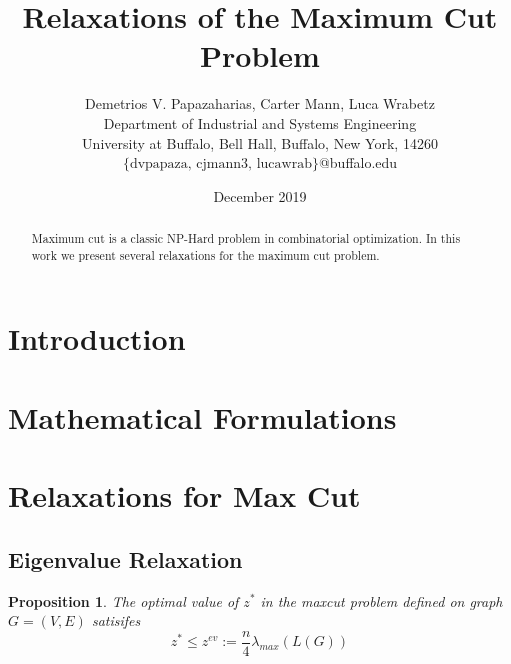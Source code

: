 \documentclass[12pt]{article}
\title{Relaxations of the Maximum Cut Problem}
\author{Demetrios V. Papazaharias, Carter Mann, Luca Wrabetz\\ \small Department of Industrial and Systems Engineering \\
\small University at Buffalo, Bell Hall, Buffalo, New York, 14260\\\small $\lbrace \text{dvpapaza, cjmann3, lucawrab}\rbrace$@buffalo.edu}
\date{December 2019}
\theoremstyle{plain}
\newtheorem{prop}{Proposition}
\theoremstyle{definition}
\begin{document}
\maketitle
\begin{abstract}
    Maximum cut is a classic NP-Hard problem in combinatorial optimization. In this work we present several relaxations for the maximum cut problem. 
\end{abstract}

\clearpage
\newcommand{\norm}[1]{\left\lVert#1\right\rVert}
\section{Introduction}\label{sec:Introduction}
\section{Mathematical Formulations}\label{sec:Formulations}
\section{Relaxations for Max Cut}\label{sec:Relaxations}
\subsection{Eigenvalue Relaxation}\label{subsec:Eigenvalue}

\begin{prop}
The optimal value of $z^*$ in the maxcut problem defined on graph $G=(V,E)$ satisifes
\[
    z^* \leq z^{ev} := \dfrac{n}{4} \lambda_{max}(L(G))
\]
\end{prop}
\end{document}
